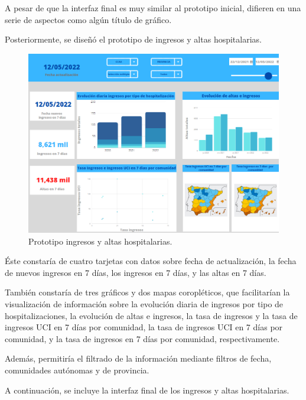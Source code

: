 A pesar de que la interfaz final es muy similar al prototipo inicial, difieren en una serie de aspectos como algún título de gráfico.

\newpage
Posteriormente, se diseñó el prototipo de ingresos y altas hospitalarias. 

\begin{figure}[h]
    \advance\leftskip-1cm 
    \includegraphics[scale=0.7]{img/prototipo_ingresosYaltas.PNG}
    \caption{Prototipo ingresos y altas hospitalarias.}
\end{figure}

Éste constaría de cuatro tarjetas con datos sobre fecha de actualización, la fecha de nuevos ingresos en 7 días, los ingresos en 7 días, y las altas en 7 días. 

También constaría de tres gráficos y dos mapas coropléticos, que facilitarían la visualización de información sobre la evolución diaria de ingresos por tipo de hospitalizaciones, la evolución de altas e ingresos, la tasa de ingresos y la tasa de ingresos UCI en 7 días por comunidad, la tasa de ingresos UCI en 7 días por comunidad, y la tasa de ingresos en 7 días por comunidad, respectivamente. 

Además, permitiría el filtrado de la información mediante filtros de fecha, comunidades autónomas y de provincia.

\newpage
A continuación, se incluye la interfaz final de los ingresos y altas hospitalarias. 

